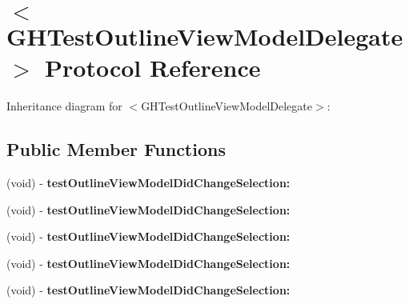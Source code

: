\hypertarget{protocol_g_h_test_outline_view_model_delegate-p}{
\section{$<$\-G\-H\-Test\-Outline\-View\-Model\-Delegate$>$ \-Protocol \-Reference}
\label{protocol_g_h_test_outline_view_model_delegate-p}
}


\-Inheritance diagram for $<$\-G\-H\-Test\-Outline\-View\-Model\-Delegate$>$\-:
\subsection*{\-Public \-Member \-Functions}
\begin{DoxyCompactItemize}
\item 
\hypertarget{protocol_g_h_test_outline_view_model_delegate-p_a9d6620a4bbad343859468847b7db6385}{
(void) -\/ {\bfseries test\-Outline\-View\-Model\-Did\-Change\-Selection\-:}}
\label{protocol_g_h_test_outline_view_model_delegate-p_a9d6620a4bbad343859468847b7db6385}

\item 
\hypertarget{protocol_g_h_test_outline_view_model_delegate-p_a9d6620a4bbad343859468847b7db6385}{
(void) -\/ {\bfseries test\-Outline\-View\-Model\-Did\-Change\-Selection\-:}}
\label{protocol_g_h_test_outline_view_model_delegate-p_a9d6620a4bbad343859468847b7db6385}

\item 
\hypertarget{protocol_g_h_test_outline_view_model_delegate-p_a9d6620a4bbad343859468847b7db6385}{
(void) -\/ {\bfseries test\-Outline\-View\-Model\-Did\-Change\-Selection\-:}}
\label{protocol_g_h_test_outline_view_model_delegate-p_a9d6620a4bbad343859468847b7db6385}

\item 
\hypertarget{protocol_g_h_test_outline_view_model_delegate-p_a9d6620a4bbad343859468847b7db6385}{
(void) -\/ {\bfseries test\-Outline\-View\-Model\-Did\-Change\-Selection\-:}}
\label{protocol_g_h_test_outline_view_model_delegate-p_a9d6620a4bbad343859468847b7db6385}

\item 
\hypertarget{protocol_g_h_test_outline_view_model_delegate-p_a9d6620a4bbad343859468847b7db6385}{
(void) -\/ {\bfseries test\-Outline\-View\-Model\-Did\-Change\-Selection\-:}}
\label{protocol_g_h_test_outline_view_model_delegate-p_a9d6620a4bbad343859468847b7db6385}


\end{DoxyCompactItemize}
